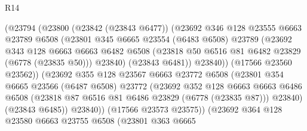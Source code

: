 \begin{lexlean}{R14}
\begin{coremodule}
{{{{{{{{{{{{{{{{{{{{{{{{{{{{{{{{{{{{{{{{{{{{{{{{{{{{{{{{{{{{{{{{{{{{{{{{{{{{{{{{{{                            (@23794
                              (@23800
                                (@23842 (@23843 @6477))
                                (@23692
                                  @346
                                  @128
                                  @23555
                                  @6663
                                  @23789
                                  @6508
                                  (@23801
                                    @345
                                    @6665
                                    @23554
                                    (@6483 @6508)
                                    @23789
                                    (@23692
                                      @343
                                      @128
                                      @6663
                                      @6663
                                      @6482
                                      @6508
                                      (@23818 @50 @6516 @81 @6482 @23829 (@6778 (@23835 @50)))
                                      @23840)
                                    (@23843 @6481))
                                  @23840))
                              (@17566 @23560 @23562))
                            (@23692
                              @355
                              @128
                              @23567
                              @6663
                              @23772
                              @6508
                              (@23801
                                @354
                                @6665
                                @23566
                                (@6487 @6508)
                                @23772
                                (@23692
                                  @352
                                  @128
                                  @6663
                                  @6663
                                  @6486
                                  @6508
                                  (@23818 @87 @6516 @81 @6486 @23829 (@6778 (@23835 @87)))
                                  @23840)
                                (@23843 @6485))
                              @23840))
                          (@17566 @23573 @23575))
                        (@23692
                          @364
                          @128
                          @23580
                          @6663
                          @23755
                          @6508
                          (@23801
                            @363
                            @6665
}}}}}}}}}}}}}}}}}}}}}}}}}}}}}}}}}}}}}}}}}}}}}}}}}}}}}}}}}}}}}}}}}}}}}}}}}}}}}}}}}}
\end{coremodule}
\end{lexlean}
